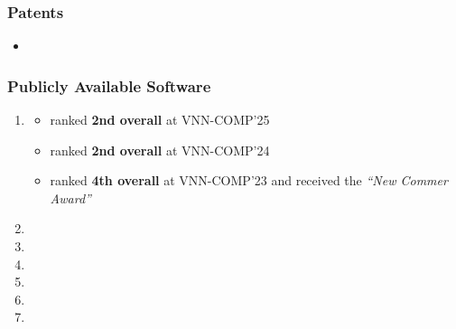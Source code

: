 \documentclass[11pt]{article}
\begin{document}
\subsubsection{Patents}
\begin{itemize}
    \item {}
\end{itemize}



\subsubsection{Publicly Available Software}
\begin{enumerate}[label=S\arabic*]

    \item {}
        \begin{itemize}[before=\small]
        \item ranked \textbf{2nd overall} at VNN-COMP'25
        \item ranked \textbf{2nd overall} at VNN-COMP'24
        \item ranked \textbf{4th overall} at VNN-COMP'23 and received the \emph{``New Commer Award''}
    \end{itemize}
    \item {}
    \item {}
    \item {}
    \item {}    
    \item {}
    \item {}
\end{enumerate}
\end{document}
